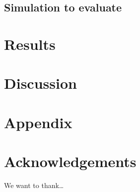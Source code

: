 \documentclass[submit]{smj}
\begin{document}
\subsection{Simulation to evaluate}

\section{Results}

\section{Discussion}

\section{Appendix}
\section*{Acknowledgements}
We want to thank\ldots





%
%
%
%
%
%
\end{document}
